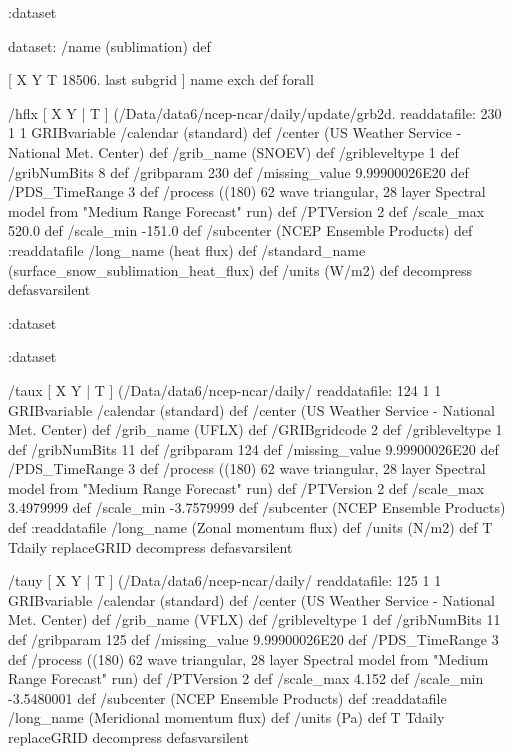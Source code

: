 \begin{ingrid}
   :dataset

   dataset: /name (sublimation) def

    [ X Y T 18506. last subgrid ] { name exch def } forall

    /hflx { [ X Y | T ] (/Data/data6/ncep-ncar/daily/update/grb2d.%
    readdatafile:
    230 1 1 GRIBvariable
    /calendar (standard) def
    /center (US Weather Service - National Met. Center) def
    /grib_name (SNOEV) def
    /gribleveltype 1 def
    /gribNumBits 8 def
    /gribparam 230 def
    /missing_value 9.99900026E20 def 
    /PDS_TimeRange 3 def
    /process ((180) 62 wave triangular, 28 layer Spectral model from "Medium Range Forecast" run) def
    /PTVersion 2 def
    /scale_max 520.0 def
    /scale_min -151.0 def
    /subcenter (NCEP Ensemble Products) def
    :readdatafile
    /long_name (heat flux) def
    /standard_name (surface_snow_sublimation_heat_flux) def
    /units (W/m2) def
    decompress
    } defasvarsilent

   :dataset

  :dataset

  /taux { [ X Y | T ] (/Data/data6/ncep-ncar/daily/%
  readdatafile:
  124 1 1 GRIBvariable
  /calendar (standard) def
  /center (US Weather Service - National Met. Center) def
  /grib_name (UFLX) def
  /GRIBgridcode 2 def
  /gribleveltype 1 def
  /gribNumBits 11 def
  /gribparam 124 def
  /missing_value 9.99900026E20 def 
  /PDS_TimeRange 3 def
  /process ((180) 62 wave triangular, 28 layer Spectral model from "Medium Range Forecast" run) def
  /PTVersion 2 def
  /scale_max 3.4979999 def
  /scale_min -3.7579999 def
  /subcenter (NCEP Ensemble Products) def
  :readdatafile
  /long_name (Zonal momentum flux) def
  /units (N/m2) def
  T Tdaily replaceGRID
  decompress
  } defasvarsilent

  /tauy { [ X Y | T ] (/Data/data6/ncep-ncar/daily/%
  readdatafile:
  125 1 1 GRIBvariable
  /calendar (standard) def
  /center (US Weather Service - National Met. Center) def
  /grib_name (VFLX) def
  /gribleveltype 1 def
  /gribNumBits 11 def
  /gribparam 125 def
  /missing_value 9.99900026E20 def 
  /PDS_TimeRange 3 def
  /process ((180) 62 wave triangular, 28 layer Spectral model from "Medium Range Forecast" run) def
  /PTVersion 2 def
  /scale_max 4.152 def
  /scale_min -3.5480001 def
  /subcenter (NCEP Ensemble Products) def
  :readdatafile
  /long_name (Meridional momentum flux) def
  /units (Pa) def
  T Tdaily replaceGRID
  decompress
  } defasvarsilent


\end{ingrid}
